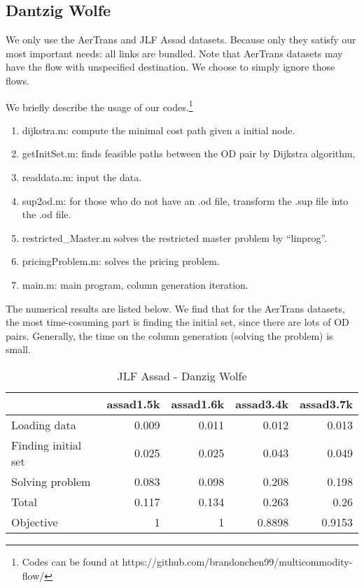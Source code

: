 \subsection{Dantzig Wolfe}
We only use the AerTrans and JLF Assad datasets. Because only they satisfy our most important needs: all links are bundled. Note that AerTrans datasets may have the flow with unspecified destination. We choose to simply ignore those flows. 

We briefly describe the usage of our codes.\footnote{Codes can be found at https://github.com/brandonchen99/multicommodity-flow/}
\begin{enumerate}
    \item dijkstra.m: compute the minimal cost path given a initial node.
    \item getInitSet.m: finds feasible paths between the OD pair by Dijkstra algorithm,
    \item readdata.m: input the data.
    \item sup2od.m: for those who do not have an .od file, transform the .sup file into the .od file.
    \item restricted\_Master.m solves the restricted master problem by ``linprog''.
    \item pricingProblem.m: solves the pricing problem.
    \item main.m: main program, column generation iteration.
\end{enumerate}

The numerical results are listed below. We find that for the AerTrans datasets, the most time-cosuming part is finding the initial set, since there are lots of OD pairs. Generally, the time on the column generation (solving the problem) is small.


\begin{table}[htbp]
  \centering
  \caption{JLF Assad - Danzig Wolfe}
    \begin{tabular}{lrrrr}
    \toprule
          & \multicolumn{1}{l}{assad1.5k} & \multicolumn{1}{l}{assad1.6k} & \multicolumn{1}{l}{assad3.4k} & \multicolumn{1}{l}{assad3.7k} \\
              \midrule

    Loading data & 0.009 & 0.011 & 0.012 & 0.013 \\
    Finding initial set & 0.025 & 0.025 & 0.043 & 0.049 \\
    Solving problem & 0.083 & 0.098 & 0.208 & 0.198 \\
    Total & 0.117 & 0.134 & 0.263 & 0.26 \\
    Objective & 1&1 &0.8898& 0.9153\\
    \bottomrule
    \end{tabular}%
  \label{tab:addlabel}%
\end{table}%

